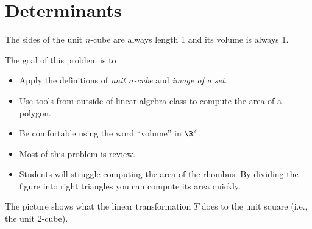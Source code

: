 \documentclass{problemset}
\begin{document}
\section*{Determinants}
	The sides of the unit $n$-cube are always length 1 and its volume is always 1.

	\question
	\begin{annotation}
		\begin{goals}

			The goal of this problem is to
			\begin{itemize}
				\item Apply the definitions of \emph{unit $n$-cube} and \emph{image of a set}.
				\item Use tools from outside of linear algebra class to compute the area of a polygon.
				\item Be comfortable using the word ``volume'' in $\R^2$.
			\end{itemize}
		\end{goals}

		\begin{notes}
			\begin{itemize}
				\item Most of this problem is review.
				\item Students will struggle computing the area of the rhombus. By dividing
					the figure into right triangles you can compute its area quickly.
			\end{itemize}
		\end{notes}
	\end{annotation}
	The picture shows what the linear transformation $T$ does to the unit square (i.e., the unit $2$-cube).
\end{document}
